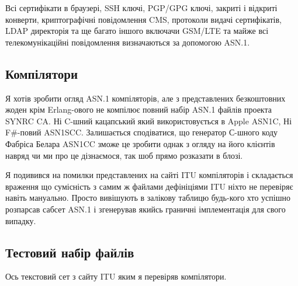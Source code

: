 Всі сертифікати в браузері, SSH ключі, PGP/GPG ключі, закриті і відкриті конверти, криптографічні повідомлення CMS, протоколи видачі сертифікатів, LDAP директорія та ще багато іншого включачи GSM/LTE та майже всі телекомунікаційні повідомлення визначаються за допомогою ASN.1.

\subsection{Компілятори}

Я хотів зробити огляд ASN.1 компіляторів, але з представлених безкоштовних жоден крім Erlang-ового не компілює повний набір ASN.1 файлів проекта SYNRC CA. Ні C-шний кацапський який використовується в Apple ASN1C, Ні F\#-повий ASN1SCC. Залишається сподіватися, що генератор С-шного коду Фабріса Белара ASN1CC зможе це зробити однак з огляду на його клієнтів навряд чи ми про це дізнаємося, так шоб прямо розказати в блозі.

Я подивився на помилки представлених на сайті ITU компіляторів і складається враження що сумісність з самим ж файлами дефініціями ITU ніхто не перевіряє навіть мануально. Просто вивішують в залікову таблицю будь-кого хто успішно розпарсав сабсет ASN.1 і згенерував якийсь граничні імплементація для свого випадку.

\subsection{Тестовий набір файлів}

Ось текстовий сет з сайту ITU яким я перевіряв компілятори.

\renewcommand{\footnotesize}{\tiny}

